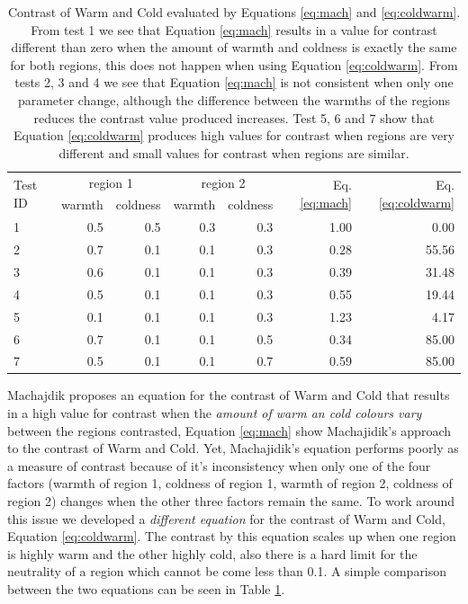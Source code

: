 \documentclass[11pt,a4paper,twoside,openright]{report}
\begin{document}
\begin{table}[pht]  %
\centering
\begin{tabular}{l|r|r|r|r|r|r}
\toprule
\multirow{2}{*}{Test ID}
  & \multicolumn{2}{c}{region 1}
  & \multicolumn{2}{c}{region 2}
  & \multirow{2}{*}{Eq. \ref{eq:mach}}
  & \multirow{2}{*}{Eq. \ref{eq:coldwarm}}
  \\
\cline{2-5}
& warmth & coldness & warmth & coldness \\
\midrule
1 & 0.5 & 0.5 & 0.3 & 0.3 & 1.00 & 0.00  \\
2 & 0.7 & 0.1 & 0.1 & 0.3 & 0.28 & 55.56 \\
3 & 0.6 & 0.1 & 0.1 & 0.3 & 0.39 & 31.48 \\
4 & 0.5 & 0.1 & 0.1 & 0.3 & 0.55 & 19.44 \\
5 & 0.1 & 0.1 & 0.1 & 0.3 & 1.23 & 4.17  \\
6 & 0.7 & 0.1 & 0.1 & 0.5 & 0.34 & 85.00 \\
7 & 0.5 & 0.1 & 0.1 & 0.7 & 0.59 & 85.00 \\
\bottomrule
\end{tabular}
\caption[Contrast of Warm and Cold]{Contrast of Warm and Cold evaluated by
Equations \ref{eq:mach} and \ref{eq:coldwarm}.  From test 1 we see that
Equation \ref{eq:mach} results in a value for contrast different than zero when
the amount of warmth and coldness is exactly the same for both regions, this
does not happen when using Equation \ref{eq:coldwarm}.  From tests 2, 3 and 4
we see that Equation \ref{eq:mach} is not consistent when only one parameter
change, although the difference between the warmths of the regions reduces the
contrast value produced increases.  Test 5, 6 and 7 show that Equation
\ref{eq:coldwarm} produces high values for contrast when regions are very
different and small values for contrast when regions are similar.}
\label{tab:cweq}
\end{table}

Machajdik \cite{mach10clas} proposes an equation for the contrast of Warm and
Cold that results in a high value for contrast when the \emph{amount of warm an
cold colours vary} between the regions contrasted, Equation \ref{eq:mach} show
Machajidik's approach to the contrast of Warm and Cold.  Yet, Machajidik's
equation performs poorly as a measure of contrast because of it's inconsistency
when only one of the four factors (warmth of region 1, coldness of region 1,
warmth of region 2, coldness of region 2) changes when the other three factors
remain the same.  To work around this issue we developed a \emph{different
equation} for the contrast of Warm and Cold, Equation \ref{eq:coldwarm}.  The
contrast by this equation scales up when one region is highly warm and the
other highly cold, also there is a hard limit for the neutrality of a region
which cannot be come less than 0.1.  A simple comparison between the two
equations can be seen in Table \ref{tab:cweq}.
\end{document}
